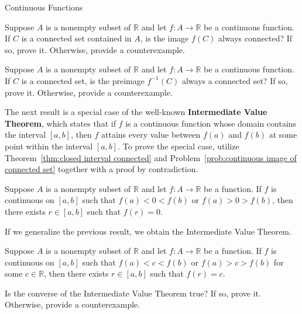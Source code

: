 \begin{section}{Continuous Functions}
\begin{problem}\label{prob:continuous image of connected set}
Suppose $A$ is a nonempty subset of $\mathbb{R}$ and let $f:A\to \mathbb{R}$ be a continuous function. If $C$ is a connected set contained in $A$, is the image $f(C)$ always connected?  If so, prove it.  Otherwise, provide a counterexample.
\end{problem}

\begin{problem}
Suppose $A$ is a nonempty subset of $\mathbb{R}$ and let $f:A\to \mathbb{R}$ be a continuous function. If $C$ is a connected set, is the preimage $f^{-1}(C)$ always a connected set? If so, prove it.  Otherwise, provide a counterexample.
\end{problem}

The next result is a special case of the well-known \textbf{Intermediate Value Theorem}, which states that if $f$ is a continuous function whose domain contains the interval $[a,b]$, then $f$ attains every value between $f(a)$ and $f(b)$ at some point within the interval $[a,b]$. To prove the special case, utilize Theorem~\ref{thm:closed interval connected} and Problem~\ref{prob:continuous image of connected set} together with a proof by contradiction.

\begin{theorem}
Suppose $A$ is a nonempty subset of $\mathbb{R}$ and let $f:A\to \mathbb{R}$ be a function. If $f$ is continuous on $[a,b]$ such that $f(a)<0<f(b)$ or $f(a)>0>f(b)$, then there exists $r\in [a,b]$ such that $f(r)=0$.
\end{theorem}

If we generalize the previous result, we obtain the Intermediate Value Theorem.

\begin{theorem}
Suppose $A$ is a nonempty subset of $\mathbb{R}$ and let $f:A\to \mathbb{R}$ be a function. If $f$ is continuous on $[a,b]$ such that $f(a)<c<f(b)$ or $f(a)>c>f(b)$ for some $c\in \mathbb{R}$, then there exists $r\in [a,b]$ such that $f(r)=c$.
\end{theorem}


\begin{problem}
Is the converse of the Intermediate Value Theorem true? If so, prove it.  Otherwise, provide a counterexample.
\end{problem}


\end{section}
